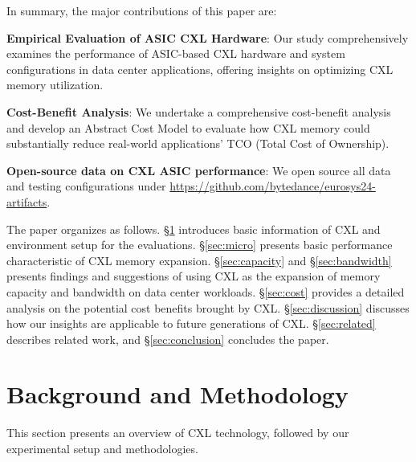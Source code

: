 In summary, the major contributions of this paper are:
\begin{icompact}
\item \textbf{Empirical Evaluation of ASIC CXL Hardware}:
Our study comprehensively examines the performance of ASIC-based CXL hardware and system configurations in data center applications, offering insights on optimizing CXL memory utilization.

\item \textbf{Cost-Benefit Analysis}: We undertake a comprehensive cost-benefit analysis and develop an Abstract Cost Model to evaluate how CXL memory could substantially reduce real-world applications' TCO (Total Cost of Ownership).

\item \textbf{Open-source data on CXL ASIC performance}: We open source all data and testing configurations under \url{https://github.com/bytedance/eurosys24-artifacts}.


\end{icompact}

The paper organizes as follows. \S\ref{sec:background} introduces basic information of CXL and 
environment setup for the evaluations. \S\ref{sec:micro} presents basic performance characteristic of CXL memory expansion. \S\ref{sec:capacity} and \S\ref{sec:bandwidth} presents findings and suggestions of using CXL as the expansion of memory capacity and bandwidth on data center workloads. \S\ref{sec:cost}  provides a detailed analysis on the potential cost benefits brought by CXL. \S\ref{sec:discussion} discusses how our insights are applicable to future generations of CXL. \S\ref{sec:related} describes related work, and \S\ref{sec:conclusion} concludes the paper.















\section{Background and Methodology}
\label{sec:background}

This section presents an overview of CXL technology, followed by our experimental setup and methodologies.


